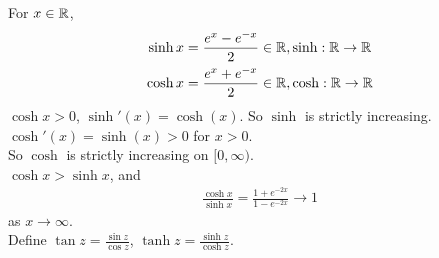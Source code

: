\documentclass[a4paper]{article}
\begin{document}
For $x\in\mathbb{R}$,
\begin{equation*}
\begin{aligned}
\sinh x&=\frac{e^x-e^{-x}}{2} \in \mathbb{R}, \sinh:\mathbb{R}\to\mathbb{R}\\
\cosh x&=\frac{e^x+e^{-x}}{2} \in \mathbb{R}, \cosh:\mathbb{R}\to\mathbb{R}
\end{aligned}
\end{equation*}
$\cosh x>0$, $\sinh'\left(x\right)=\cosh\left(x\right)$. So $\sinh$ is strictly increasing.\\
$\cosh'\left(x\right)=\sinh\left(x\right) > 0$ for $x>0$.\\
So $\cosh$ is strictly increasing on $[0,\infty)$.\\
$\cosh x > \sinh x$, and\\
\begin{equation*}
\begin{aligned}
\frac{\cosh x}{\sinh x} = \frac{1+e^{-2x}}{1-e^{-2x}} \to 1
\end{aligned}
\end{equation*}
as $x\to\infty$.\\
Define $\tan z = \frac{\sin z}{\cos z}$, $\tanh z = \frac{\sinh z}{\cosh z}$.
\end{document}
